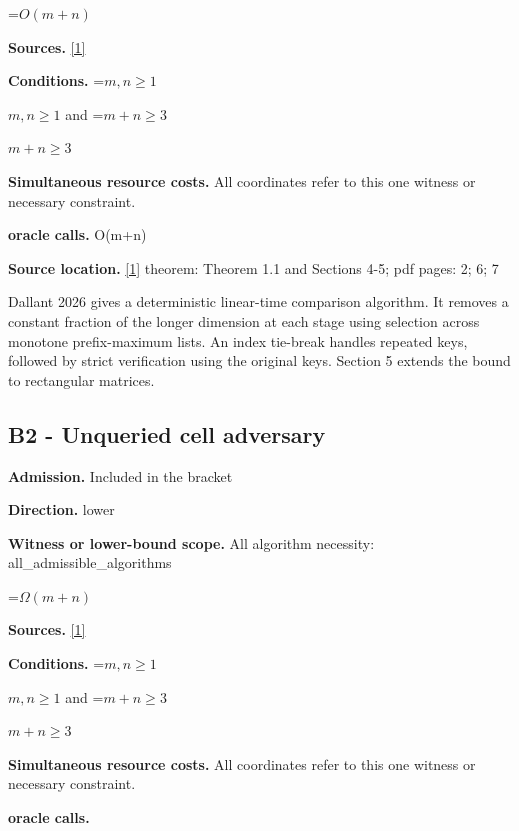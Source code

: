 \documentclass[10pt,a4paper]{article}
\newcommand{\AtlasMath}[1]{\par\begingroup\centering\setbox0=\hbox{$\displaystyle #1$}\ifdim\wd0>1.4\linewidth\typeout{ATLAS WIDE FORMULA: \the\wd0}\fi\ifdim\wd0>\linewidth\resizebox{\linewidth}{!}{\box0}\else\box0\fi\par\endgroup}
\newcommand{\AtlasInlineMath}[1]{\begingroup\setbox0=\hbox{$#1$}\ifdim\wd0>.4\linewidth\endgroup\AtlasMath{#1}\else\endgroup$#1$\fi}
\begin{document}
\AtlasMath{O(m+n)}


\textbf{Sources.} \href{https://arxiv.org/abs/2607.22312v1}{[1]}



\textbf{Conditions.} \AtlasInlineMath{m,n\ge1} and \AtlasInlineMath{m+n\ge3}



\textbf{Simultaneous resource costs.} All coordinates refer to this one witness or necessary constraint.



\textbf{oracle calls.} O(m+n)



\textbf{Source location.} \href{https://arxiv.org/abs/2607.22312v1}{[1]} theorem: Theorem 1.1 and Sections 4-5; pdf pages: 2; 6; 7



Dallant 2026 gives a deterministic linear-time comparison algorithm. It removes a constant fraction of the longer dimension at each stage using selection across monotone prefix-maximum lists. An index tie-break handles repeated keys, followed by strict verification using the original keys. Section 5 extends the bound to rectangular matrices.



\subsection{B2 - Unqueried cell adversary}


\textbf{Admission.} Included in the bracket



\textbf{Direction.} lower



\textbf{Witness or lower-bound scope.} All algorithm necessity: all\_admissible\_algorithms



\AtlasMath{\Omega(m+n)}


\textbf{Sources.} \href{https://arxiv.org/abs/2607.22312v1}{[1]}



\textbf{Conditions.} \AtlasInlineMath{m,n\ge1} and \AtlasInlineMath{m+n\ge3}



\textbf{Simultaneous resource costs.} All coordinates refer to this one witness or necessary constraint.



\textbf{oracle calls.}
\end{document}
